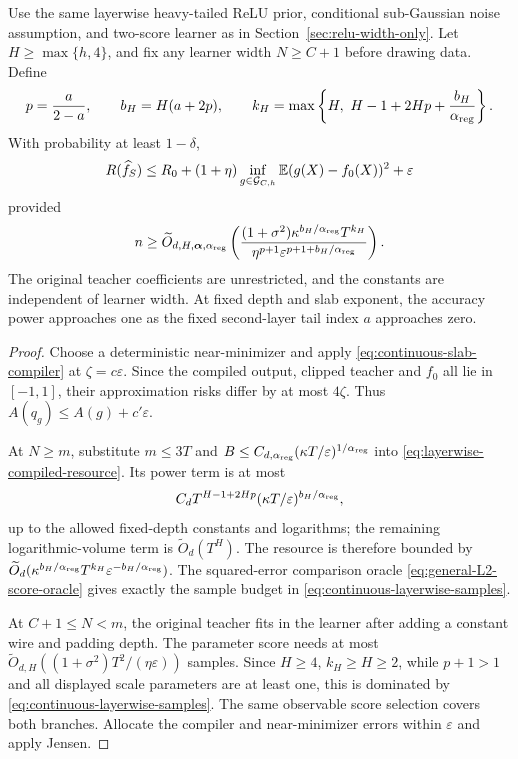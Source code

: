 \begin{theorem}
\label{thm:continuous-layerwise-width}
Use the same layerwise heavy-tailed ReLU prior, conditional sub-Gaussian noise assumption, and two-score learner as in Section~\ref{sec:relu-width-only}. Let $H\ge\max\{h,4\}$, and fix any learner width $N\ge C+1$ before drawing data. Define
\[
 p=\frac a{2-a},\qquad b_H=H(a+2p),\qquad
 k_H=\max\left\{H,\ H-1+2Hp+\frac{b_H}{\alpha_{\rm reg}}\right\}.
\]
With probability at least $1-\delta$,
\begin{equation}
 R(\widehat f_S)\le R_0+(1+\eta)
      \inf_{g\in\mathcal G_{C,h}}\mathbb E(g(X)-f_0(X))^2+\varepsilon
 \label{eq:continuous-layerwise-oracle}
\end{equation}
provided
\begin{equation}
 n\ge\widetilde O_{d,H,\boldsymbol\alpha,\alpha_{\rm reg}}\left(
 \frac{(1+\sigma^2)\kappa^{b_H/\alpha_{\rm reg}}T^{k_H}}
 {\eta^{p+1}\varepsilon^{p+1+b_H/\alpha_{\rm reg}}}
 \right).
 \label{eq:continuous-layerwise-samples}
\end{equation}
The original teacher coefficients are unrestricted, and the constants are independent of learner width. At fixed depth and slab exponent, the accuracy power approaches one as the fixed second-layer tail index $a$ approaches zero.
\end{theorem}
\begin{proof}
Choose a deterministic near-minimizer and apply \eqref{eq:continuous-slab-compiler} at $\zeta=c\varepsilon$. Since the compiled output, clipped teacher and $f_0$ all lie in $[-1,1]$, their approximation risks differ by at most $4\zeta$. Thus $A(q_g)\le A(g)+c'\varepsilon$.

At $N\ge m$, substitute $m\le3T$ and
$B\le C_{d,\alpha_{\rm reg}}(\kappa T/\varepsilon)^{1/\alpha_{\rm reg}}$ into
\eqref{eq:layerwise-compiled-resource}. Its power term is at most
\[
 C_d T^{H-1+2Hp}
       (\kappa T/\varepsilon)^{b_H/\alpha_{\rm reg}},
\]
up to the allowed fixed-depth constants and logarithms; the remaining logarithmic-volume term is $\widetilde O_d(T^H)$. The resource is therefore bounded by
$\widetilde O_d(\kappa^{b_H/\alpha_{\rm reg}}T^{k_H}
\varepsilon^{-b_H/\alpha_{\rm reg}})$.
The squared-error comparison oracle \eqref{eq:general-L2-score-oracle} gives exactly the sample budget in \eqref{eq:continuous-layerwise-samples}.

At $C+1\le N<m$, the original teacher fits in the learner after adding a constant wire and padding depth. The parameter score needs at most
$\widetilde O_{d,H}((1+\sigma^2)T^2/(\eta\varepsilon))$ samples.
Since $H\ge4$, $k_H\ge H\ge2$, while $p+1>1$ and all displayed scale parameters are at least one, this is dominated by \eqref{eq:continuous-layerwise-samples}. The same observable score selection covers both branches. Allocate the compiler and near-minimizer errors within $\varepsilon$ and apply Jensen.
\end{proof}

